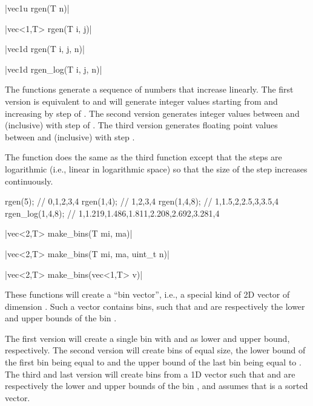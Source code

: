 \funcitem \cppinline|vec1u rgen(T n)| 

\cppinline|vec<1,T> rgen(T i, j)|

\cppinline|vec1d rgen(T i, j, n)|

\cppinline|vec1d rgen_log(T i, j, n)| 

The  functions generate a sequence of numbers that increase linearly. The first version is equivalent to  and will generate  integer values starting from  and increasing by step of . The second version generates integer values between  and  (inclusive) with step of . The third version generates  floating point values between  and  (inclusive) with step .

The  function does the same as the third  function except that the steps are logarithmic (i.e., linear in logarithmic space) so that the size of the step increases continuously.

\begin{example}
\begin{cppcode}
rgen(5); // {0,1,2,3,4}
rgen(1,4); // {1,2,3,4}
rgen(1,4,8); // {1,1.5,2,2.5,3,3.5,4}
rgen_log(1,4,8); // {1,1.219,1.486,1.811,2.208,2.692,3.281,4}
\end{cppcode}
\end{example}

\funcitem \cppinline|vec<2,T> make_bins(T mi, ma)| 

\cppinline|vec<2,T> make_bins(T mi, ma, uint_t n)|

\cppinline|vec<2,T> make_bins(vec<1,T> v)|

These functions will create a ``bin vector'', i.e., a special kind of 2D vector of dimension \cppinline{[2,n]}. Such a vector contains  bins, such that  and  are respectively the lower and upper bounds of the bin .

The first version will create a single bin with  and  as lower and upper bound, respectively. The second version will create  bins of equal size, the lower bound of the first bin being equal to  and the upper bound of the last bin being equal to . The third and last version will create bins from a 1D vector such that  and  are respectively the lower and upper bounds of the bin , and assumes that  is a sorted vector.


